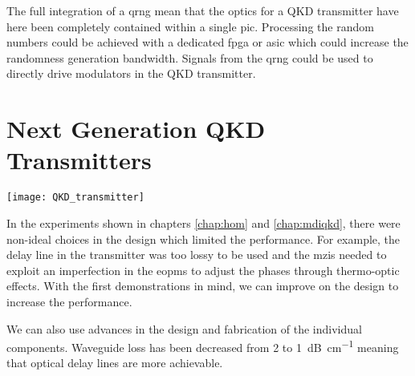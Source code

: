 



The full integration of a \ac{qrng} mean that the optics for a \ac{QKD} transmitter have here been completely contained within a single \ac{pic}. Processing the random numbers could be achieved with a dedicated \ac{fpga} or \ac{asic} which could increase the randomness generation bandwidth. Signals from the \ac{qrng} could be used to directly drive modulators in the \ac{QKD} transmitter.

\section{Next Generation QKD Transmitters}

\begin{sidewaysfigure}
	\centering
	\texttt{[image: QKD\_transmitter]}
	\caption[Layout of latest generation InP QKD Transmitter]{Latest generation \ac{InP} transmitter fabricated by Fraunhofer \acs{hhi}. The \SI{6x4}{mm} chip contains three ways to create BB84 states for \acs{QKD}. The optical components are shown in blue, while the electrical connects are in red. Light created with on-chip lasers and manipulated with \acsp{cipm} and \acs{topm}. States are coupled off the chip through \acsp{ssc} into fibre.}
	\label{fig:hhi_gds}
\end{sidewaysfigure}

In the experiments shown in chapters \ref{chap:hom} and \ref{chap:mdiqkd}, there were non-ideal choices in the design which limited the performance. For example, the delay line in the transmitter was too lossy to be used and the \acp{mzi} needed to exploit an imperfection in the \acp{eopm} to adjust the phases through thermo-optic effects. With the first demonstrations in mind, we can improve on the design to increase the performance.

We can also use advances in the design and fabrication of the individual components. Waveguide loss has been decreased from \num{2} to \SI{1}{dB\per\cm} \cite{JeppixRoadmap} meaning that optical delay lines are more achievable. 

